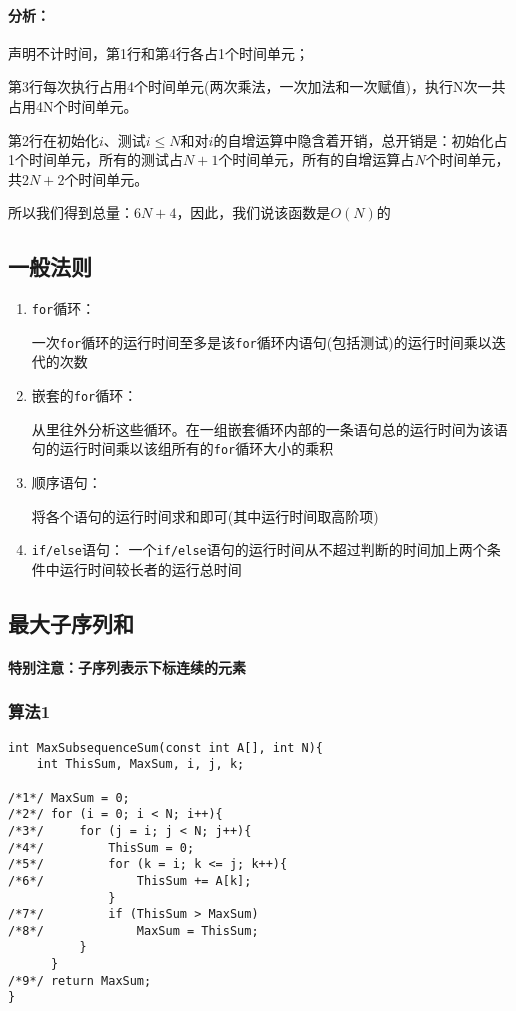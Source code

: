 \documentclass[utf8]{ctexbook}
\begin{document}
\paragraph{分析：}声明不计时间，第1行和第4行各占1个时间单元；

第3行每次执行占用4个时间单元(两次乘法，一次加法和一次赋值)，执行N次一共占用4N个时间单元。

第2行在初始化$i$、测试$i\le N$和对$i$的自增运算中隐含着开销，总开销是：初始化占1个时间单元，所有的测试占$N+1$个时间单元，所有的自增运算占$N$个时间单元，共$2N+2$个时间单元。

所以我们得到总量：$6N+4$，因此，我们说该函数是$O(N)$的

\subsection{一般法则}
\begin{enumerate}
    \item \verb|for|循环：

       一次\verb|for|循环的运行时间至多是该\verb|for|循环内语句(包括测试)的运行时间乘以迭代的次数
   \item 嵌套的\verb|for|循环：

       从里往外分析这些循环。在一组嵌套循环内部的一条语句总的运行时间为该语句的运行时间乘以该组所有的\verb|for|循环大小的乘积
   \item 顺序语句：
       
       将各个语句的运行时间求和即可(其中运行时间取高阶项)
   \item \verb|if/else|语句：
       一个\verb|if/else|语句的运行时间从不超过判断的时间加上两个条件中运行时间较长者的运行总时间
\end{enumerate}
\subsection{最大子序列和}
\paragraph{特别注意：子序列表示下标连续的元素}
\subsubsection{算法1}
\begin{lstlisting}
int MaxSubsequenceSum(const int A[], int N){
    int ThisSum, MaxSum, i, j, k;

/*1*/ MaxSum = 0;
/*2*/ for (i = 0; i < N; i++){
/*3*/     for (j = i; j < N; j++){
/*4*/         ThisSum = 0;
/*5*/         for (k = i; k <= j; k++){
/*6*/             ThisSum += A[k];
              }
/*7*/         if (ThisSum > MaxSum)
/*8*/             MaxSum = ThisSum;
          }
      }
/*9*/ return MaxSum;
}
\end{lstlisting}
\end{document}
